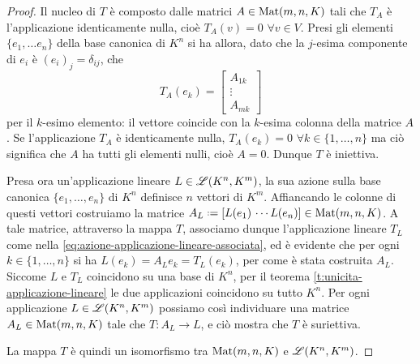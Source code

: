 \begin{proof}
	Il nucleo di $T$ è composto dalle matrici $A\in\operatorname{Mat}(m,n,K)$ tali che $T_A$ è l'applicazione identicamente nulla, cioè $T_A(v)=0$ $\forall v\in V$.
	Presi gli elementi $\{e_1,\dots e_n\}$ della base canonica di $K^n$ si ha allora, dato che la $j$-esima componente di $e_i$ è $(e_i)_j=\delta_{ij}$, che
	\begin{equation}
		T_A(e_k)=
		\begin{bmatrix}
			A_{1k}\\
			\vdots\\
			A_{mk}
		\end{bmatrix}
	\end{equation}
	per il $k$-esimo elemento: il vettore coincide con la $k$-esima colonna della matrice $A$.
	Se l'applicazione $T_A$ è identicamente nulla, $T_A(e_k)=0$ $\forall k\in\{1,\dots,n\}$ ma ciò significa che $A$ ha tutti gli elementi nulli, cioè $A=0$.
	Dunque $T$ è iniettiva.

	Presa ora un'applicazione lineare $L\in\mathscr L(K^n,K^m)$, la sua azione sulla base canonica $\{e_1,\dots,e_n\}$ di $K^n$ definisce $n$ vettori di $K^m$.
	Affiancando le colonne di questi vettori costruiamo la matrice $A_L\defeq[L(e_1)\,\cdots L(e_n)]\in\mat(m,n,K)$.
	A tale matrice, attraverso la mappa $T$, associamo dunque l'applicazione lineare $T_L$ come nella \eqref{eq:azione-applicazione-lineare-associata}, ed è evidente che per ogni $k\in\{1,\dots,n\}$ si ha $L(e_k)=A_Le_k=T_L(e_k)$, per come è stata costruita $A_L$.
	Siccome $L$ e $T_L$ coincidono su una base di $K^n$, per il teorema \ref{t:unicita-applicazione-lineare} le due applicazioni coincidono su tutto $K^n$.
	Per ogni applicazione $L\in\mathscr L(K^n,K^m)$ possiamo cos\`i individuare una matrice $A_L\in\operatorname{Mat}(m,n,K)$ tale che $T\colon A_L\to L$, e ciò mostra che $T$ è suriettiva.

	La mappa $T$ è quindi un isomorfismo tra $\operatorname{Mat}(m,n,K)$ e $\mathscr L(K^n,K^m)$.
\end{proof}

